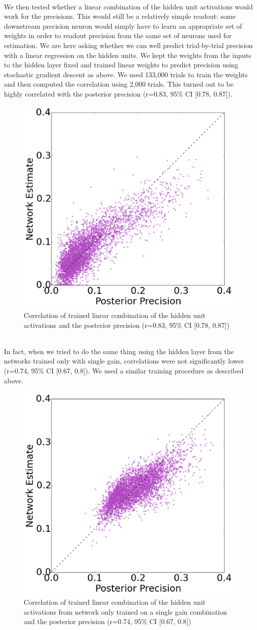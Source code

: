 \documentclass{article} %
\begin{document}
\\
We then tested whether a linear combination of the hidden unit activations would work for the precisions. This would still be a relatively simple readout: some downstream precision neuron would simply have to learn an appropriate set of weights in order to readout precision from the same set of neurons used for estimation. We are here asking whether we can well predict trial-by-trial precision with a linear regression on the hidden units. We kept the weights from the inputs to the hidden layer fixed and trained linear weights to predict precision using stochastic gradient descent as above. We used 133,000 trials to train the weights and then computed the correlation using 2,000 trials. This turned out to be highly correlated with the posterior precision (r=0.83,  95\% CI [0.78, 0.87]). 
\begin{figure}[h]
\centering
\includegraphics[width = .5\textwidth]{Linear_Combination_Precisions.png}
\caption{Correlation of trained linear combination of the hidden unit activations and the posterior precision (r=0.83,  95\% CI [0.78, 0.87])}
\end{figure}
\\
In fact, when we tried to do the same thing using the hidden layer from the networks trained only with single gain, correlations were not significantly lower (r=0.74, 95\% CI [0.67, 0.8]). We used a similar training procedure as described above.
\begin{figure}[h]
\centering
\includegraphics[width = .5\textwidth]{Linear_Fixed_Gains_Precisions.png}
\caption{Correlation of trained linear combination of the hidden unit activations from network only trained on a single gain combination and the posterior precision (r=0.74, 95\% CI [0.67, 0.8])}
\end{figure}
\end{document}
